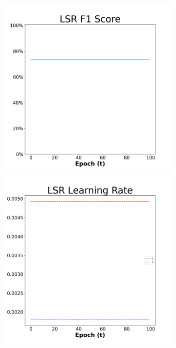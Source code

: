 \begin{figure}[H]
    \centering %
\begin{subfigure}{0.3\textwidth}
  \includegraphics[width=\linewidth]{images/exper2/SP/LSR_0.01_f1.png}
    \includegraphics[width=\linewidth]{images/exper2/SP/LSR_0.01_lr.png}

\end{subfigure}
\end{figure}
